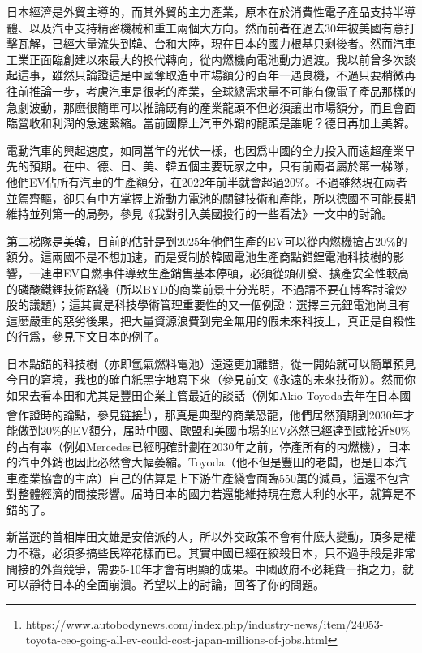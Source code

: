 \documentclass[twocolumn]{ctexart}
\begin{document}
日本經濟是外貿主導的，而其外貿的主力產業，原本在於消費性電子產品支持半導體、以及汽車支持精密機械和重工兩個大方向。然而前者在過去30年被美國有意打擊瓦解，已經大量流失到韓、台和大陸，現在日本的國力根基只剩後者。然而汽車工業正面臨創建以來最大的換代轉向，從内燃機向電池動力過渡。我以前曾多次談起這事，雖然只論證這是中國奪取造車市場額分的百年一遇良機，不過只要稍微再往前推論一步，考慮汽車是很老的產業，全球總需求量不可能有像電子產品那樣的急劇波動，那麽很簡單可以推論既有的產業龍頭不但必須讓出市場額分，而且會面臨營收和利潤的急速緊縮。當前國際上汽車外銷的龍頭是誰呢？德日再加上美韓。

電動汽車的興起速度，如同當年的光伏一樣，也因爲中國的全力投入而遠超產業早先的預期。在中、德、日、美、韓五個主要玩家之中，只有前兩者屬於第一梯隊，他們EV佔所有汽車的生產額分，在2022年前半就會超過20\%。不過雖然現在兩者並駕齊驅，卻只有中方掌握上游動力電池的關鍵技術和產能，所以德國不可能長期維持並列第一的局勢，參見《我對引入美國投行的一些看法》一文中的討論。

第二梯隊是美韓，目前的估計是到2025年他們生產的EV可以從内燃機搶占20\%的額分。這兩國不是不想加速，而是受制於韓國電池生產商點錯鋰電池科技樹的影響，一連串EV自燃事件導致生產銷售基本停頓，必須從頭研發、擴產安全性較高的磷酸鐵鋰技術路綫（所以BYD的商業前景十分光明，不過請不要在博客討論炒股的議題）；這其實是科技學術管理重要性的又一個例證：選擇三元鋰電池尚且有這麽嚴重的惡劣後果，把大量資源浪費到完全無用的假未來科技上，真正是自殺性的行爲，參見下文日本的例子。

日本點錯的科技樹（亦即氫氣燃料電池）遠遠更加離譜，從一開始就可以簡單預見今日的窘境，我也的確白紙黑字地寫下來（參見前文《永遠的未來技術》）。然而你如果去看本田和尤其是豐田企業主管最近的談話（例如Akio Toyoda去年在日本國會作證時的論點，參見\href{https://www.autobodynews.com/index.php/industry-news/item/24053-toyota-ceo-going-all-ev-could-cost-japan-millions-of-jobs.html}{链接\footnote{\url{https://www.autobodynews.com/index.php/industry-news/item/24053-toyota-ceo-going-all-ev-could-cost-japan-millions-of-jobs.html}}}），那真是典型的商業恐龍，他們居然預期到2030年才能做到20\%的EV額分，届時中國、歐盟和美國市場的EV必然已經達到或接近80\%的占有率（例如Mercedes已經明確計劃在2030年之前，停產所有的内燃機），日本的汽車外銷也因此必然會大幅萎縮。Toyoda（他不但是豐田的老闆，也是日本汽車產業協會的主席）自己的估算是上下游生產綫會面臨550萬的減員，這還不包含對整體經濟的間接影響。届時日本的國力若還能維持現在意大利的水平，就算是不錯的了。

新當選的首相岸田文雄是安倍派的人，所以外交政策不會有什麽大變動，頂多是權力不穩，必須多搞些民粹花樣而已。其實中國已經在絞殺日本，只不過手段是非常間接的外貿競爭，需要5-10年才會有明顯的成果。中國政府不必耗費一指之力，就可以靜待日本的全面崩潰。希望以上的討論，回答了你的問題。
\\
\end{document}
